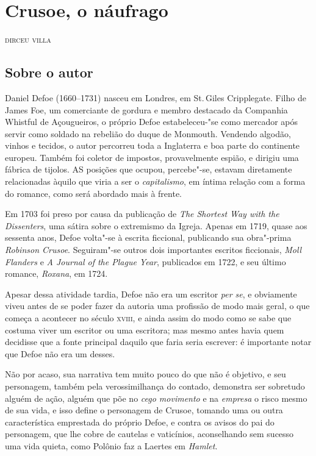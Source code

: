 \chapter{Crusoe, o náufrago}

\begin{flushright}
\textsc{dirceu villa}\bigskip
\end{flushright}

\section{Sobre o autor}

\noindent{}Daniel Defoe (1660--1731) nasceu em Londres, em St.\,Giles Cripplegate. Filho de James Foe, um comerciante de gordura e membro destacado da Companhia Whistful de Açougueiros, o próprio Defoe estabeleceu-"se como mercador após servir como soldado na rebelião do duque de Monmouth. Vendendo algodão, vinhos e tecidos, o autor percorreu toda a Inglaterra e boa parte do continente europeu. Também foi coletor de impostos, provavelmente espião, e dirigiu uma fábrica de tijolos.
AS posições que ocupou, percebe"-se, estavam diretamente relacionadas àquilo que viria a ser o \emph{capitalismo}, em íntima relação com a forma do romance, como será abordado mais à frente.

Em 1703 foi preso por causa da publicação de \textit{The Shortest Way with the Dissenters}, uma sátira sobre o extremismo da Igreja. Apenas em 1719, quase aos sessenta anos, Defoe volta"-se à escrita ficcional, publicando sua obra"-prima \textit{Robinson Crusoe}. Seguiram"-se outros dois importantes escritos ficcionais, \textit{Moll Flanders} e \textit{A Journal of the Plague Year}, publicados em 1722, e seu último romance, \textit{Roxana},  em 1724. 

Apesar dessa atividade tardia, Defoe não era um escritor \emph{per se}, e obviamente viveu antes de se
poder fazer da autoria uma profissão de modo mais geral, o que começa a
acontecer no século \textsc{xviii}, e ainda assim do modo como se sabe que
costuma viver um escritor ou uma escritora; mas mesmo antes havia quem
decidisse que a fonte principal daquilo que faria seria escrever: é
importante notar que Defoe não era um desses.

Não por acaso, sua narrativa tem muito pouco do que não é objetivo, e
seu personagem, também pela verossimilhança do contado, demonstra ser
sobretudo alguém de ação, alguém que põe no \emph{cego movimento} e na
\emph{empresa} o risco mesmo de sua vida, e isso define o personagem de
Crusoe, tomando uma ou outra característica emprestada do próprio Defoe,
e contra os avisos do pai do personagem, que lhe cobre de cautelas e
vaticínios, aconselhando sem sucesso uma vida quieta, como Polônio faz a
Laertes em \emph{Hamlet}.

